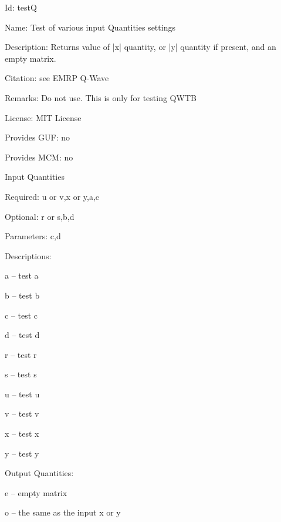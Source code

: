 \begin{tightdesc}
\item [Id:] testQ
\item [Name:] Test of various input Quantities settings
\item [Description:] Returns value of |x| quantity, or |y| quantity if present, and an empty matrix.
\item [Citation:] see EMRP Q-Wave
\item [Remarks:] Do not use. This is only for testing QWTB
\item [License:] MIT License
\item [Provides GUF:] no
\item [Provides MCM:] no
\item [Input Quantities] \rule{0em}{0em}
    \begin{tightdesc}
    \item [Required:] 
        \textsf{u} or \textsf{v},\enspace \textsf{x} or \textsf{y},\enspace \textsf{a},\enspace \textsf{c}
    \item [Optional:] 
        \textsf{r} or \textsf{s},\enspace \textsf{b},\enspace \textsf{d}
    \item [Parameters:] 
        \textsf{c},\enspace \textsf{d}
    \item [Descriptions:] \rule{0em}{0em}
        \begin{tightdesc}
            \item[\textsf{a}] -- test a
            \item[\textsf{b}] -- test b
            \item[\textsf{c}] -- test c
            \item[\textsf{d}] -- test d
            \item[\textsf{r}] -- test r
            \item[\textsf{s}] -- test s
            \item[\textsf{u}] -- test u
            \item[\textsf{v}] -- test v
            \item[\textsf{x}] -- test x
            \item[\textsf{y}] -- test y
        \end{tightdesc}
    \end{tightdesc}
\item [Output Quantities:] \rule{0em}{0em}
    \begin{tightdesc}
        \item[\textsf{e}] -- empty matrix
        \item[\textsf{o}] -- the same as the input x or y
    \end{tightdesc}
\end{tightdesc}

